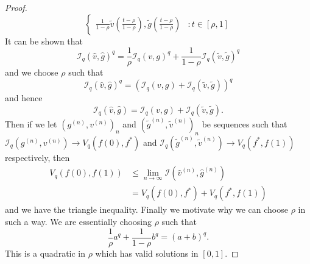 \documentclass[10pt,a4paper]{amsart}
\begin{document}
\begin{proof}
\begin{equation*}
\begin{cases}
            \frac{1}{1-\rho}\tilde{v}\left(\frac{t- \rho}{1- \rho} \right),\tilde{g}\left(\frac{t-\rho}{1-\rho}\right) &: t \in [\rho,1]
        \end{cases}
    \end{equation*}
    It can be shown that 
    \begin{equation*}
        \mathcal{I}_q(\hat{v},\hat{g})^q = \frac{1}{\rho}\mathcal{I}_q(v,g)^q + \frac{1}{1 - \rho}\mathcal{I}_q(\tilde{v},\tilde{g})^q
    \end{equation*}
    and we choose $\rho$ such that 
    \begin{equation*}
        \mathcal{I}_q(\hat{v},\hat{g})^q = \left(\mathcal{I}_q(v,g) + \mathcal{I}_q(\tilde{v},\tilde{g}) \right)^q
    \end{equation*}
    and hence 
    \begin{equation*}
         \mathcal{I}_q(\hat{v},\hat{g}) = \mathcal{I}_q(v,g) + \mathcal{I}_q(\tilde{v},\tilde{g}).
    \end{equation*}
    Then if we let $(g^{(n)},v^{(n)})_n$ and $(\tilde{g}^{(n)},\tilde{v}^{(n)})_n$ be sequences such that $\mathcal{I}_q(g^{(n)},v^{(n)}) \rightarrow V_q(f(0),f^*)$ and $\mathcal{I}_q(\tilde{g}^{(n)},\tilde{v}^{(n)}) \rightarrow V_q(f^*,f(1))$ respectively, then 
    \begin{align*}
        V_q(f(0),f(1)) &\leq \lim_{n \rightarrow \infty} \mathcal{I}(\hat{v}^{(n)},\hat{g}^{(n)}) \\
        &= V_q(f(0),f^*) + V_q(f^*,f(1))
    \end{align*}
    and we have the triangle inequality. Finally we motivate why we can choose $\rho$ in such a way. We are essentially choosing $\rho$ such that 
    \begin{equation*}
        \frac{1}{\rho}a^q + \frac{1}{1-\rho}b^q = (a+b)^q.
    \end{equation*}
    This is a quadratic in $\rho$ which has valid solutions in $[0,1]$.
\end{proof}
\end{document}
